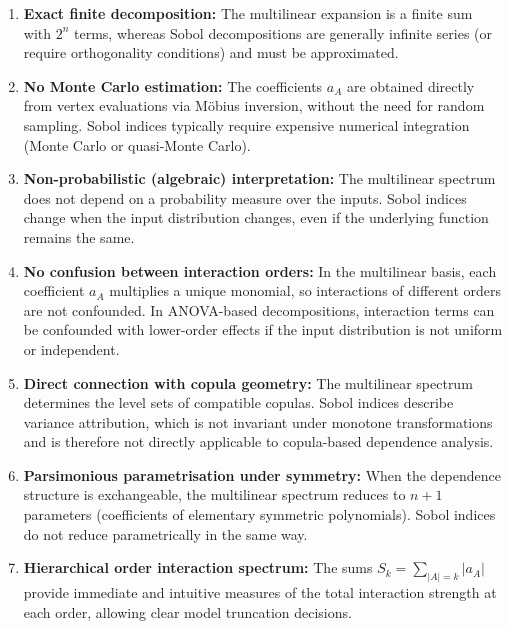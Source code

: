 \begin{enumerate}
    \item \textbf{Exact finite decomposition:} The multilinear expansion is a finite sum with \(2^n\) terms, whereas Sobol decompositions are generally infinite series (or require orthogonality conditions) and must be approximated.

    \item \textbf{No Monte Carlo estimation:} The coefficients \(a_A\) are obtained directly from vertex evaluations via Möbius inversion, without the need for random sampling. Sobol indices typically require expensive numerical integration (Monte Carlo or quasi-Monte Carlo).

    \item \textbf{Non-probabilistic (algebraic) interpretation:} The multilinear spectrum does not depend on a probability measure over the inputs. Sobol indices change when the input distribution changes, even if the underlying function remains the same.

    \item \textbf{No confusion between interaction orders:} In the multilinear basis, each coefficient \(a_A\) multiplies a unique monomial, so interactions of different orders are not confounded. In ANOVA-based decompositions, interaction terms can be confounded with lower-order effects if the input distribution is not uniform or independent.

    \item \textbf{Direct connection with copula geometry:} The multilinear spectrum determines the level sets of compatible copulas. Sobol indices describe variance attribution, which is not invariant under monotone transformations and is therefore not directly applicable to copula-based dependence analysis.

    \item \textbf{Parsimonious parametrisation under symmetry:} When the dependence structure is exchangeable, the multilinear spectrum reduces to \(n+1\) parameters (coefficients of elementary symmetric polynomials). Sobol indices do not reduce parametrically in the same way.

    \item \textbf{Hierarchical order interaction spectrum:} The sums \(S_k = \sum_{|A|=k}|a_A|\) provide immediate and intuitive measures of the total interaction strength at each order, allowing clear model truncation decisions.
\end{enumerate}

